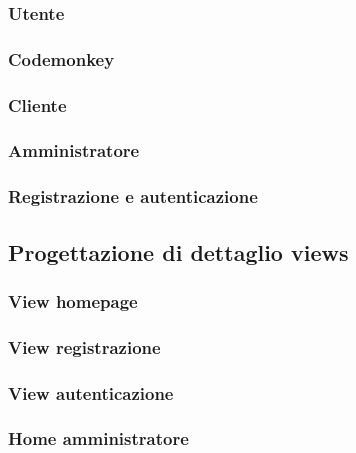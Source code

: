 \documentclass{article}
\begin{document}
\subsubsection{Utente}

\subsubsection{Codemonkey}

\subsubsection{Cliente}

\subsubsection{Amministratore}

\subsubsection{Registrazione e autenticazione}


\subsection{Progettazione di dettaglio views}
\subsubsection{View homepage}

\subsubsection{View registrazione}

\subsubsection{View autenticazione}

\subsubsection{Home amministratore}

\end{document}
